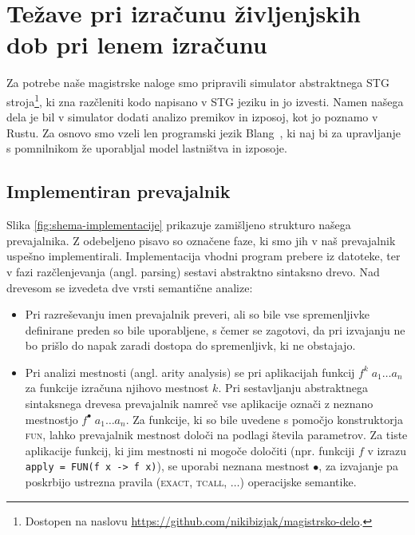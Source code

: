 \chapter[Življenjske dobe in leni izračun]{Težave pri izračunu življenjskih dob pri lenem izračunu}

Za potrebe naše magistrske naloge smo pripravili simulator abstraktnega STG stroja\footnote{Dostopen na naslovu \url{https://github.com/nikibizjak/magistrsko-delo}.}, ki zna razčleniti kodo napisano v STG jeziku in jo izvesti. Namen našega dela je bil v simulator dodati analizo premikov in izposoj, kot jo poznamo v Rustu. Za osnovo smo vzeli len programski jezik Blang~\cite{turk2022len}, ki naj bi za upravljanje s pomnilnikom že uporabljal model lastništva in izposoje.



\section{Implementiran prevajalnik}
Slika \ref{fig:shema-implementacije} prikazuje zamišljeno strukturo našega prevajalnika. Z odebeljeno pisavo so označene faze, ki smo jih v naš prevajalnik uspešno implementirali. Implementacija vhodni program prebere iz datoteke, ter v fazi razčlenjevanja (angl. parsing) sestavi abstraktno sintaksno drevo. Nad drevesom se izvedeta dve vrsti semantične analize:

\begin{itemize}
    \itemsep 0em
    \item Pri razreševanju imen prevajalnik preveri, ali so bile vse spremenljivke definirane preden so bile uporabljene, s čemer se zagotovi, da pri izvajanju ne bo prišlo do napak zaradi dostopa do spremenljivk, ki ne obstajajo.
    \item Pri analizi mestnosti (angl. arity analysis) se pri aplikacijah funkcij $f^k \; a_1 \dots a_n$ za funkcije izračuna njihovo mestnost $k$. Pri sestavljanju abstraktnega sintaksnega drevesa prevajalnik namreč vse aplikacije označi z neznano mestnostjo $f^{\bullet} \; a_1 \dots a_n$. Za funkcije, ki so bile uvedene s pomočjo konstruktorja \textsc{fun}, lahko prevajalnik mestnost določi na podlagi števila parametrov. Za tiste aplikacije funkcij, ki jim mestnosti ni mogoče določiti (npr. funkciji $f$ v izrazu \texttt{apply = FUN(f x -> f x)}), se uporabi neznana mestnost $\bullet$, za izvajanje pa poskrbijo  ustrezna pravila (\textsc{exact}, \textsc{tcall}, $\dots$) operacijske semantike.
\end{itemize}

